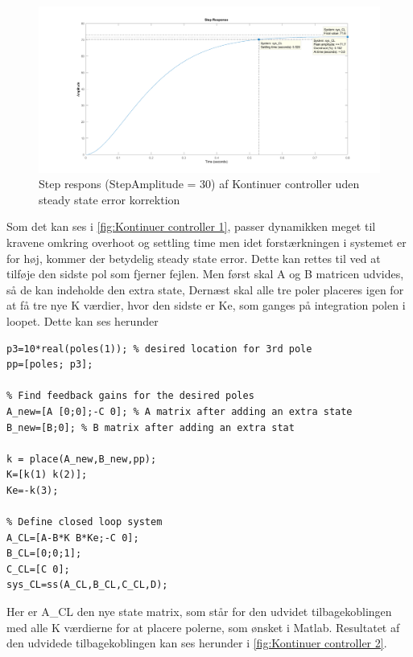 \begin{figure}[H]
	\centering
	\includegraphics[width = 1\textwidth]{figur/Step_continues_1}
	\caption{Step respons (StepAmplitude = 30) af Kontinuer controller uden steady state error korrektion}
	\label{fig:Kontinuer controller 1}
\end{figure}

Som det kan ses i \autoref{fig:Kontinuer controller 1}, passer dynamikken meget til kravene omkring overhoot og settling time men idet forstærkningen i systemet er for høj, kommer der  betydelig steady state error. Dette kan rettes til ved at tilføje den sidste pol som fjerner fejlen. Men først skal A og B matricen udvides, så de kan indeholde den extra state, Dernæst skal alle tre poler placeres igen for at få tre nye K værdier, hvor den sidste er Ke, som ganges på integration polen i loopet. Dette kan ses herunder

\begin{lstlisting}[frame=single]
p3=10*real(poles(1)); % desired location for 3rd pole
pp=[poles; p3];

% Find feedback gains for the desired poles
A_new=[A [0;0];-C 0]; % A matrix after adding an extra state
B_new=[B;0]; % B matrix after adding an extra stat

k = place(A_new,B_new,pp);
K=[k(1) k(2)];
Ke=-k(3);

% Define closed loop system
A_CL=[A-B*K B*Ke;-C 0];
B_CL=[0;0;1];
C_CL=[C 0];
sys_CL=ss(A_CL,B_CL,C_CL,D);
\end{lstlisting}

Her er A\_CL den nye state matrix, som står for den udvidet tilbagekoblingen med alle K værdierne for at placere polerne, som ønsket i Matlab. Resultatet af den udvidede tilbagekoblingen kan ses herunder i \autoref{fig:Kontinuer controller 2}. 

